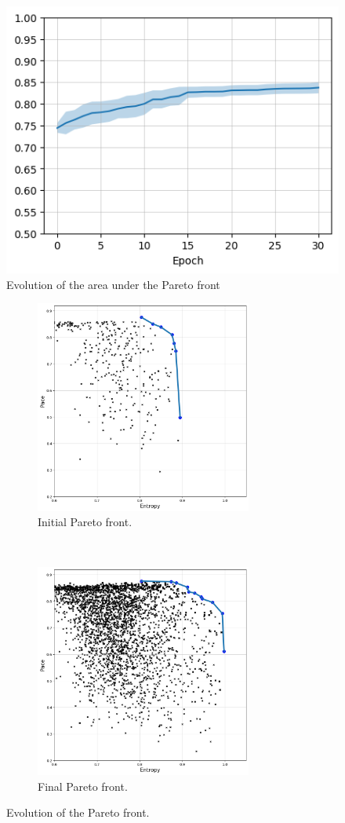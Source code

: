 \begin{figure}[hbtp]
\centering
\includegraphics[width=0.5\linewidth]{Images/images/experiment_one/Pareto/pareto_evolution_avg.png}
\caption{Evolution of the area under the Pareto front}
\label{fig:ex_one_pareto_area}
\end{figure}

\begin{figure}[hbtp]
    \centering
    \begin{subfigure}[t]{0.5\textwidth}
        \centering
        \includegraphics[height=7cm]{Images/images/experiment_one/Pareto/pareto_front_total_begin.png}
        \caption{Initial Pareto front.}
    \end{subfigure}%
    ~ 
    \begin{subfigure}[t]{0.5\textwidth}
        \centering
        \includegraphics[height=7cm]{Images/images/experiment_one/Pareto/pareto_front_total_final.png}
        \caption{Final Pareto front.}
        \label{fig:ex_one_final_pareto_total}
    \end{subfigure}
    \caption{Evolution of the Pareto front.}
    \label{fig:ex_one_pareto_evolution}
\end{figure}


